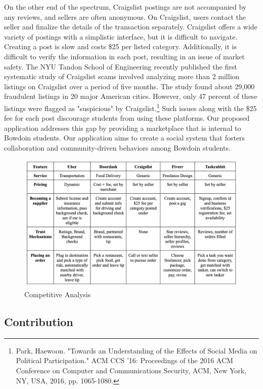 On the other end of the spectrum, Craigslist postings are not accompanied by any reviews, and sellers are often anonymous. On Craigslist, users contact the seller and finalize the details of the transaction separately. Craigslist offers a wide variety of postings with a simplistic interface, but it is difficult to navigate. Creating a post is slow and costs \$25 per listed category. Additionally, it is difficult to verify the information in each post, resulting in an issue of market safety. The NYU Tandon School of Engineering recently published the first systematic study of Craigslist scams involved analyzing more than 2 million listings on Craigslist over a period of five months. The study found about 29,000 fraudulent listings in 20 major American cities. However, only 47 percent of these listings were flagged as "suspicious" by Craigslist.\footnote{Park, Haewoon. "Towards an Understanding of the Effects of Social Media on Political Participation." ACM CCS '16: Proceedings of the 2016 ACM Conference on Computer and Communications Security, ACM, New York, NY, USA, 2016, pp. 1065-1080.} Such issues along with the \$25 fee for each post discourage students from using these platforms. Our proposed application addresses this gap by providing a marketplace that is internal to Bowdoin students. Our application aims to create a social system that fosters collaboration and community-driven behaviors among Bowdoin students.

\begin{figure}[ht]
        \centering
        \caption{Competitive Analysis}
        \includegraphics[width=1\textwidth]{images/competitors.png}
        
        \label{fig:bird1}
    \end{figure}


\subsection{Contribution}

